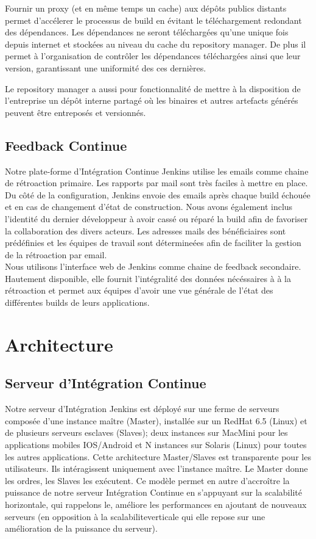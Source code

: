       Fournir un proxy (et en même temps un cache) aux dépôts publics distants permet d'accélerer le processus de build en évitant le téléchargement redondant des dépendances. Les dépendances ne seront téléchargées qu'une unique fois depuis internet et stockées au niveau du cache du repository manager. De plus il permet à l'organisation de contrôler les dépendances téléchargées ainsi que leur version, garantissant une uniformité des ces dernières.

      Le repository manager a aussi pour fonctionnalité de mettre à la disposition de l'entreprise un dépôt interne partagé où les binaires et autres artefacts générés peuvent être entreposés et versionnés.\\

    \subsection{Feedback Continue}
    Notre plate-forme d'Intégration Continue Jenkins utilise les emails comme chaine de rétroaction primaire. Les rapports par mail sont très faciles à mettre en place. Du côté de la configuration, Jenkins envoie des emails après chaque build échouée et en cas de changement d'état de construction. Nous avons également inclus l'identité du dernier développeur à avoir cassé ou réparé la build afin de favoriser la collaboration des divers acteurs. Les adresses mails des bénéficiaires sont prédéfinies et les équipes de travail sont détermineées afin de faciliter la gestion de la rétroaction par email.\\

    Nous utilisons l'interface web de Jenkins comme chaine de feedback secondaire. Hautement disponible, elle fournit l'intégralité des données nécéssaires à à la rétroaction et permet aux équipes d'avoir une vue générale de l'état des différentes builds de leurs applications.

  \section{Architecture}

    \subsection{Serveur d’Intégration Continue}
    Notre serveur d'Intégration Jenkins est déployé sur une ferme de serveurs composée d'une instance maître (Master), installée sur un RedHat 6.5 (Linux) et de plusieurs serveurs esclaves (Slaves); deux instances sur MacMini pour les applications mobiles IOS/Android et N instances sur Solaris (Linux) pour toutes les autres applications. Cette architecture Master/Slaves est transparente pour les utilisateurs. Ils intéragissent uniquement avec l'instance maître. Le Master donne les ordres, les Slaves les exécutent. Ce modèle permet en autre d'accroître la puissance de notre serveur Intégration Continue en s'appuyant sur la scalabilité horizontale, qui rappelons le, améliore les performances en ajoutant de nouveaux serveurs (en opposition à la \gls{scalabiliteverticale} qui elle repose sur une amélioration de la puissance du serveur).


